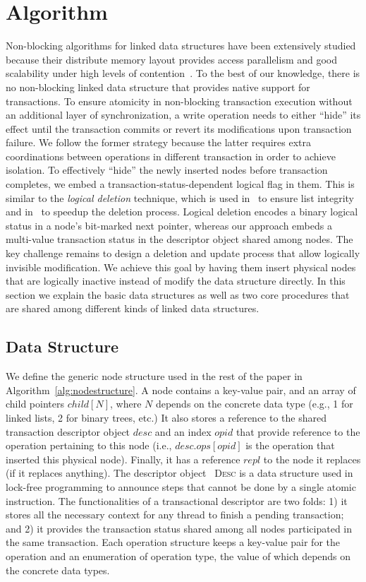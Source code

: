 \documentclass[10pt,conference,compsocconf]{IEEEtran}
\begin{document}
\section{Algorithm}
\label{sec:algorithm}
Non-blocking algorithms for linked data structures have been extensively studied because their distribute memory layout provides access parallelism and good scalability under high levels of contention~\cite{linden2013skiplist,zhang2015lockfree,michael2002high}.
To the best of our knowledge, there is no non-blocking linked data structure that provides native support for transactions.
To ensure atomicity in non-blocking transaction execution without an additional layer of synchronization, a write operation needs to either ``hide'' its effect until the transaction commits or revert its modifications upon transaction failure.
We follow the former strategy because the latter requires extra coordinations between operations in different transaction in order to achieve isolation.
To effectively ``hide'' the newly inserted nodes before transaction completes, we embed a transaction-status-dependent logical flag in them. 
This is similar to the \emph{logical deletion} technique, which is used in~\cite{harris2001pragmatic} to ensure list integrity and in~\cite{linden2013skiplist,zhang2015lockfree} to speedup the deletion process.
Logical deletion encodes a binary logical status in a node's bit-marked next pointer, whereas our approach embeds a multi-value transaction status in the descriptor object shared among nodes.
The key challenge remains to design a deletion and update process that allow logically invisible modification.
We achieve this goal by having them insert physical nodes that are logically inactive instead of modify the data structure directly.
In this section we explain the basic data structures as well as two core procedures that are shared among different kinds of linked data structures.

\subsection{Data Structure}
We define the generic node structure used in the rest of the paper in Algorithm~\ref{alg:nodestructure}. 
A node contains a key-value pair, and an array of child pointers $child[N]$, where $N$ depends on the concrete data type (e.g., 1 for linked lists, 2 for binary trees, etc.)
It also stores a reference to the shared transaction descriptor object $desc$ and an index $opid$ that provide reference to the operation pertaining to this node (i.e., $desc.ops[opid]$ is the operation that inserted this physical node).
Finally, it has a reference $repl$ to the node it replaces (if it replaces anything).
The descriptor object~\cite{herlihy2012art} \textsc{Desc} is a data structure used in lock-free programming to announce steps that cannot be done by a single atomic instruction.
The functionalities of a transactional descriptor are two folds: 1) it stores all the necessary context for any thread to finish a pending transaction; and 2) it provides the transaction status shared among all nodes participated in the same transaction.
Each operation structure keeps a key-value pair for the operation and an enumeration of operation type, the value of which depends on the concrete data types.
\end{document}
